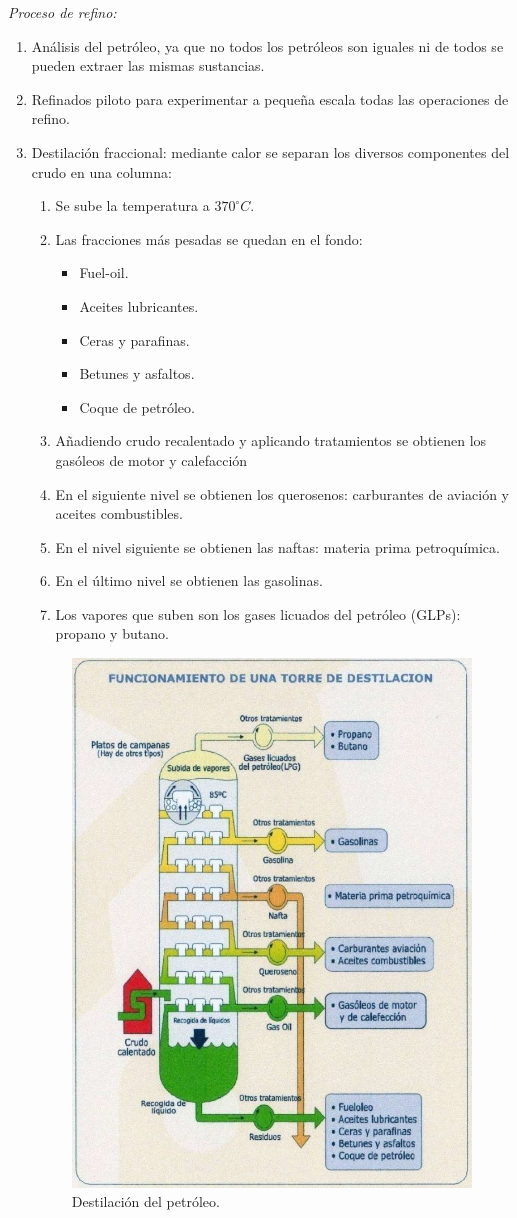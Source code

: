 			
			\textit{Proceso de refino:}
			\begin{enumerate}
				\item Análisis del petróleo, ya que no todos los petróleos son iguales ni de todos se pueden extraer las mismas sustancias.
				\item Refinados piloto para experimentar a pequeña escala todas las operaciones de refino.
				\item Destilación fraccional: mediante calor se separan los diversos componentes del crudo en una columna:
				\begin{enumerate}
					\item Se sube la temperatura a $370^\circ C$.
					\item Las fracciones más pesadas se quedan en el fondo:
					\begin{itemize}
						\item Fuel-oil.
						\item Aceites lubricantes.
						\item Ceras y parafinas.
						\item Betunes y asfaltos.
						\item Coque de petróleo.
					\end{itemize}
					\item Añadiendo crudo recalentado y aplicando tratamientos se obtienen los gasóleos de motor y calefacción
					\item En el siguiente nivel se obtienen los querosenos: carburantes de aviación y aceites combustibles.
					\item En el nivel siguiente se obtienen las naftas: materia prima petroquímica.
					\item En el último nivel se obtienen las gasolinas.
					\item Los vapores que suben son los gases licuados del petróleo (GLPs): propano y butano.
				\end{enumerate}
				\begin{figure}
					\centering
					\includegraphics[width=0.6\linewidth]{res/tema1/destilacionPetroleo}
					\caption{Destilación del petróleo.}
					\label{fig:destilacionpetroleo}
				\end{figure}
				 

\end{enumerate}
